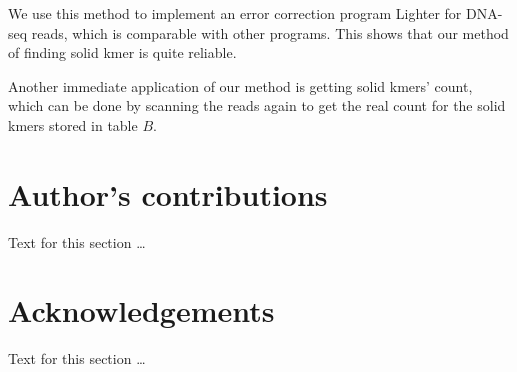 \documentclass[10pt]{article}
\begin{document}
We use this method to implement an error correction program Lighter for DNA-seq reads, which is comparable with other programs. This shows that our method of finding solid kmer is quite reliable. 

Another immediate application of our method is getting solid kmers' count, which can be done by scanning the reads again to get the real count for the solid kmers stored in table $B$.

\section*{Author's contributions}
    Text for this section \ldots

    

\section*{Acknowledgements}
  Text for this section \ldots
 
\end{document}
